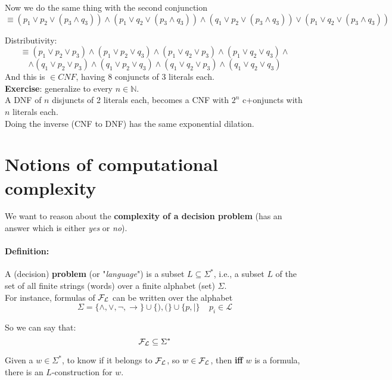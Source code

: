 \documentclass[11pt]{article}
\begin{document}
	Now we do the same thing with the second conjunction
	$$ \equiv (p_1 \vee p_2 \vee (p_3 \wedge q_3)) \wedge (p_1 \vee q_2 \vee (p_3 \wedge q_3)) \wedge
	(q_1 \vee p_2 \vee (p_3 \wedge q_3)) \vee
	(p_1 \vee q_2 \vee (p_3 \wedge q_3)) $$
	
	Distributivity:
	$$ \equiv
	(p_1 \vee p_2 \vee p_3) \wedge 
	(p_1 \vee p_2 \vee q_3) \wedge
	(p_1 \vee q_2 \vee p_3) \wedge
	(p_1 \vee q_2 \vee q_3) \wedge
	$$
	$$
	\wedge
	(q_1 \vee p_2 \vee p_3) \wedge
	(q_1 \vee p_2 \vee q_3) \wedge
	(q_1 \vee q_2 \vee p_3) \wedge
	(q_1 \vee q_2 \vee q_3)
	$$
	And this is $\in CNF$, having 8 conjuncts of 3 literals each.\\
	
	\textbf{Exercise}: generalize to every $n \in \mathbb{N}$.\\
	
	A DNF of $n$ disjuncts of 2 literals each, becomes a CNF with $2^n$ c+onjuncts with $n$ literals each.\\
	
	Doing the inverse (CNF to DNF) has the same exponential dilation.\\
	
	\newpage
	
	\section{Notions of computational complexity}
	
	We want to reason about the \textbf{complexity of a decision problem} (has an answer which is either \textit{yes} or \textit{no}).\\
	
	\paragraph{Definition:} A (decision) \textbf{problem} (or "\textit{language}") is a subset $L \subseteq \Sigma^\ast$, i.e., a subset $L$ of the set of all finite strings (words) over a finite alphabet (set) $\Sigma$.\\
	
	For instance, formulas of $\mathcal{F}_\mathcal{L}$ can be written over the alphabet
	$$ \Sigma = \{\wedge, \vee, \neg, \rightarrow\} \cup \{),(\} \cup \{p, |\} \;\;\;\; p_i \in \mathcal{L} $$
	
	So we can say that:
	$$ \mathcal{F}_\mathcal{L} \subseteq \Sigma^\ast $$
	
	Given a $w \in \Sigma^\ast$, to know if it belongs to $\mathcal{F}_\mathcal{L}$, so $w \in \mathcal{F}_\mathcal{L}$, then \textbf{iff} $w$ is a formula, there is an $L$-construction for $w$.\\
	
\end{document}
